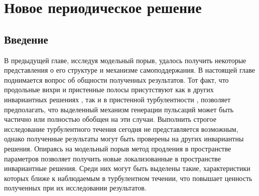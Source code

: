 
\chapter{Новое периодическое решение}

\section{Введение}

В предыдущей главе, исследуя модельный порыв, удалось получить некоторые представления о его структуре и механизме самоподдержания. В настоящей главе поднимается вопрос об общности полученных результатов. Тот факт, что продольные вихри и пристенные полосы присутствуют как в других инвариантных решениях \cite{Kawahara2012}, так и в пристенной турбулентности \cite{Kline1967, Smith1983, Schoppa2002}, позволяет предполагать, что выделенный механизм генерации пульсаций может быть частично или полностью обобщен на эти случаи. Выполнить строгое исследование турбулентного течения сегодня не представляется возможным, однако полученные результаты могут быть проверены на других инвариантны решения. Опираясь на модельный порыв метод продления в пространстве параметров \cite{Sanchez2004, Viswanath2007, Dijkstra2014} позволяет получить новые локализованные в пространстве инвариантные решения. Среди них могут быть выделены такие, характеристики которых ближе к наблюдаемым в турбулентном течении, что повышает ценность полученных при их исследовании результатов. 

